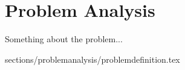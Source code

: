 \chapter{Problem Analysis}\label{ch:problemanalysis}
Something about the problem...

 {sections/problemanalysis/problemdefinition.tex}
